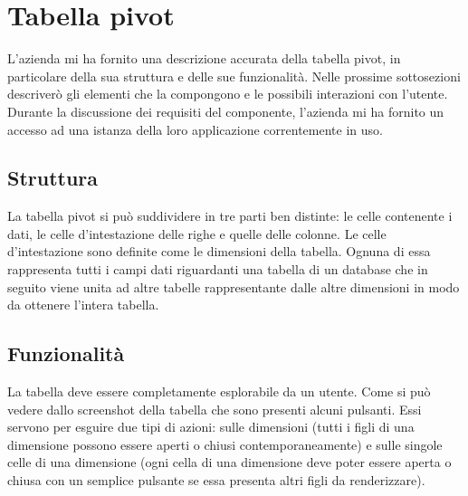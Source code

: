\section{Tabella pivot}
L'azienda mi ha fornito una descrizione accurata della tabella pivot, in particolare della sua struttura e delle sue funzionalità. Nelle prossime sottosezioni descriverò gli elementi che la compongono e le possibili interazioni con l'utente. Durante la discussione dei requisiti del componente, l'azienda mi ha fornito un accesso ad una istanza della loro applicazione correntemente in uso.
\begin{minipage}{\linewidth}
\end{minipage}

\subsection{Struttura}
La tabella pivot si può suddividere in tre parti ben distinte: le celle contenente i dati, le celle d'intestazione delle righe e quelle delle colonne. 
Le celle d'intestazione sono definite come le dimensioni della tabella. Ognuna di essa rappresenta tutti i campi dati riguardanti una tabella di un database che in seguito viene unita ad altre tabelle rappresentante dalle altre dimensioni in modo da ottenere l'intera tabella.

\subsection{Funzionalità}
La tabella deve essere completamente esplorabile da un utente. Come si può vedere dallo screenshot della tabella che sono presenti alcuni pulsanti. Essi servono per esguire due tipi di azioni: sulle dimensioni (tutti i figli di una dimensione possono essere aperti o chiusi contemporaneamente) e sulle singole celle di una dimensione (ogni cella di una dimensione deve poter essere aperta o chiusa con un semplice pulsante se essa presenta altri figli da renderizzare).

